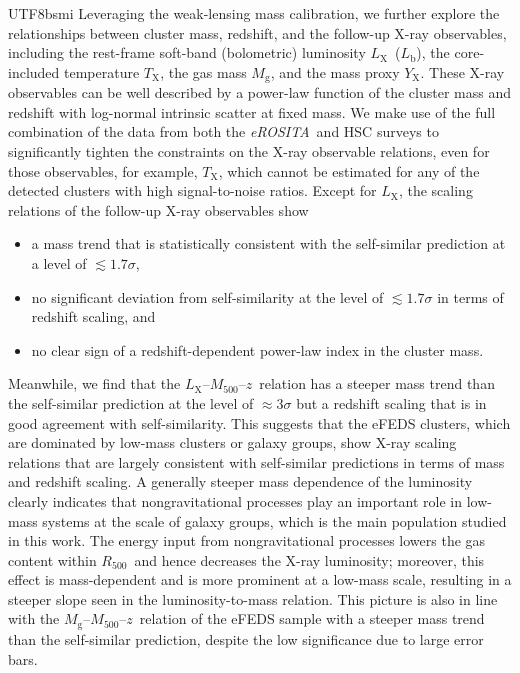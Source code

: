 \documentclass[longauth]{aa}
\newcommand{\Rfiveoo}{\ensuremath{R_{500}}}
\newcommand{\Mfiveoo}{\ensuremath{M_{500}}}
\newcommand{\redshift}{\ensuremath{z}}
\newcommand{\eROSITA}{\emph{eROSITA}}
\newcommand{\Lx}{\ensuremath{L_{\mathrm{X}}}}
\newcommand{\Lb}{\ensuremath{L_{\mathrm{b}}}}
\newcommand{\Tx}{\ensuremath{T_{\mathrm{X}}}}
\newcommand{\Yx}{\ensuremath{Y_{\mathrm{X}}}}
\newcommand{\Mg}{\ensuremath{M_{\mathrm{g}}}}
\begin{document}
\begin{CJK*}{UTF8}{bsmi}
Leveraging the weak-lensing mass calibration, we further explore the relationships between cluster mass, redshift, and the follow-up X-ray observables, including the rest-frame soft-band (bolometric) luminosity \Lx\ (\Lb), the core-included temperature \Tx, the gas mass \Mg, and the mass proxy \Yx.
These X-ray observables can be well described by a power-law function of the cluster mass and redshift with log-normal intrinsic scatter at fixed mass.
We make use of the full combination of the data from both the \eROSITA\ and HSC surveys to significantly tighten the constraints on the X-ray observable relations, even for those observables, for example, \Tx, which cannot be estimated for any of the detected clusters with high signal-to-noise ratios.
Except for \Lx, the scaling relations of the follow-up X-ray observables show 
%
\begin{itemize}
\item a mass trend that is statistically consistent with the self-similar prediction at a level of 
$\lesssim1.7\sigma$,
\item no significant deviation from self-similarity at the level of 
$\lesssim1.7\sigma$
in terms of redshift scaling, and 
\item no clear sign of a redshift-dependent power-law index in the cluster mass.
\end{itemize}
%
Meanwhile, we find that the \Lx--\Mfiveoo--\redshift\ relation has a steeper mass trend than the self-similar prediction at the level of $\approx3\sigma$ but a redshift scaling that is in good agreement with self-similarity.
This suggests that the eFEDS clusters, which are dominated by low-mass clusters or galaxy groups, show X-ray scaling relations that are largely consistent with self-similar predictions in terms of mass and redshift scaling.
A generally steeper mass dependence of the luminosity clearly indicates that nongravitational processes play an important role in low-mass systems at the scale of galaxy groups, which is the main population studied in this work.
The energy input from nongravitational processes lowers the gas content within \Rfiveoo\ and hence decreases the X-ray luminosity; 
moreover, this effect is mass-dependent and is more prominent at a low-mass scale, resulting in a steeper slope seen in the luminosity-to-mass relation.
This picture is also in line with the \Mg--\Mfiveoo--\redshift\ relation of the eFEDS sample with a steeper mass trend than the self-similar prediction, despite the low significance due to large error bars.




\end{CJK*}
\end{document}
